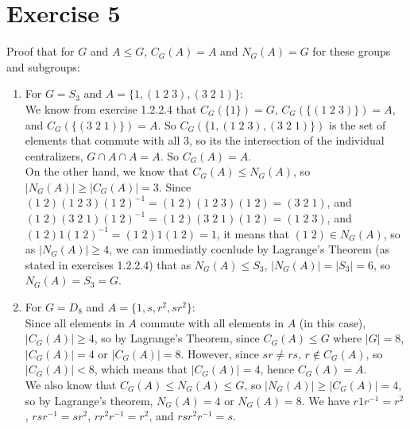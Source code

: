 \documentclass{article}
\begin{document}
    \section*{Exercise 5}
    Proof that for $G$ and $A \leqslant G$,
    $C_G(A) = A$ and $N_G(A) = G$ for these groups and subgroups: \\
    \begin{enumerate}[label=\textbf{\alph*.}]
        \item     
            For $G = S_3$ and $A = \{ 1, (1\;2\;3), (3\;2\;1) \}$: \\
            We know from exercise 1.2.2.4 that 
            $C_G(\{1\}) = G$, $C_G(\{(1\;2\;3)\}) = A$,
            and $C_G(\{(3\;2\;1)\}) = A$.
            So $C_G(\{1, (1\;2\;3), (3\;2\;1)\})$ is the set of
            elements that commute with all 3,
            so its the intersection of the individual centralizers,
            $G \cap A \cap A = A$. So $C_G(A) = A$. \\
            On the other hand, we know that $C_G(A) \leqslant N_G(A)$,
            so $|N_G(A)| \geqslant |C_G(A)| = 3$.
            Since $(1\;2)(1\;2\;3)(1\;2)^{-1} = (1\;2)(1\;2\;3)(1\;2)
            = (3\;2\;1)$,
            and $(1\;2)(3\;2\;1)(1\;2)^{-1} = (1\;2)(3\;2\;1)(1\;2)
            = (1\;2\;3)$,
            and $(1\;2)1(1\;2)^{-1} = (1\;2)1(1\;2)
            = 1$,
            it means that $(1\;2) \in N_G(A)$,
            so as $|N_G(A)| \geqslant 4$,
            we can immediatly cocnlude by Lagrange's Theorem
            (as stated in exercises 1.2.2.4)
            that as $N_G(A) \leqslant S_3$, $|N_G(A)| = |S_3| = 6$,
            so $N_G(A) = S_3 = G$.
        \item
            For $G = D_8$ and $A = \{ 1, s, r^2, sr^2 \}$: \\
            Since all elements in $A$ commute with all elements in $A$
            (in this case),
            $|C_G(A)| \geqslant 4$,
            so by Lagrange's Theorem,
            since $C_G(A) \leqslant G$ where $|G| = 8$,
            $|C_G(A)| = 4$ or $|C_G(A)| = 8$.
            However, since $sr \neq rs$, $r \notin C_G(A)$,
            so $|C_G(A)| < 8$,
            which means that $|C_G(A)| = 4$,
            hence $C_G(A) = A$. \\
            We also know that $C_G(A) \leqslant N_G(A) \leqslant G$,
            so $|N_G(A)| \geqslant |C_G(A)| = 4$,
            so by Lagrange's theorem, $N_G(A) = 4$ or $N_G(A) = 8$.
            We have $r1r^{-1} = r^2$, $rsr^{-1} = sr^2$,
            $rr^2r^{-1} = r^2$, and $rsr^2r^{-1} = s$.

\end{enumerate}
\end{document}
